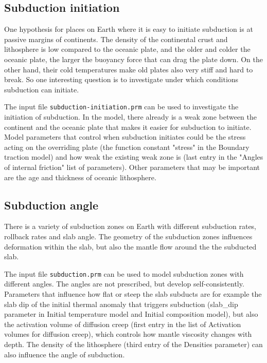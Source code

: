 \documentclass[notitlepage]{article}
\begin{document}
\subsection{Subduction initiation}

One hypothesis for places on Earth where it is easy to initiate subduction is at passive margins of continents. 
The density of the continental crust and lithosphere is low compared to the oceanic plate, and the older and 
colder the oceanic plate, the larger the buoyancy force that can drag the plate down. On the other hand, their cold 
temperatures make old plates also very stiff and hard to break. 
So one interesting question is to investigate under which conditions subduction can initiate. 

The input file \texttt{subduction-initiation.prm} can be used to investigate the initiation of subduction. 
In the model, there already is a weak zone between the continent and the oceanic plate that makes it easier
for subduction to initiate. Model parameters that control when subduction initiates could be the
stress acting on the overriding plate (the function constant "stress" in the Boundary traction model) and 
how weak the existing weak zone is (last entry in the "Angles of internal friction" list of parameters). 
Other parameters that may be important are the age and thickness of oceanic lithosphere. 

\subsection{Subduction angle}

There is a variety of subduction zones on Earth with different subduction rates, rollback rates and slab angle. 
The geometry of the subduction zones influences deformation within the slab, but also the mantle flow around
the the subducted slab. 

The input file \texttt{subduction.prm} can be used to model subduction zones with different angles. 
The angles are not prescribed, but develop self-consistently. Parameters that influence how flat or steep
the slab subducts are for example the slab dip of the initial thermal anomaly that triggers subduction
(slab\_dip parameter in Initial temperature model and Initial composition model), but also the activation 
volume of diffusion creep (first entry in the list of Activation volumes for diffusion creep), which controls 
how mantle viscosity changes with depth. 
The density of the lithosphere (third entry of the Densities parameter) can also influence the angle of subduction.
\end{document}

